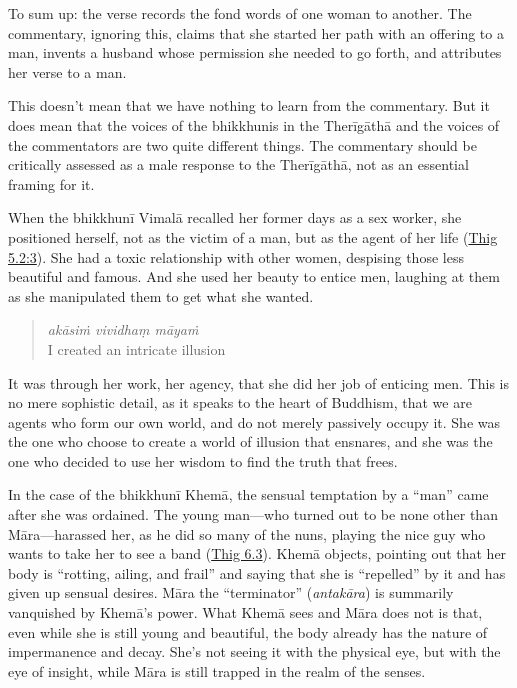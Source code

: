 \documentclass[12pt,openany]{book}%
\begin{document}
To sum up: the verse records the fond words of one woman to another. The commentary, ignoring this, claims that she started her path with an offering to a man, invents a husband whose permission she needed to go forth, and attributes her verse to a man.

This doesn’t mean that we have nothing to learn from the commentary. But it does mean that the voices of the bhikkhunis in the \textsanskrit{Therīgāthā} and the voices of the commentators are two quite different things. The commentary should be critically assessed as a male response to the \textsanskrit{Therīgāthā}, not as an essential framing for it.

When the \textsanskrit{bhikkhunī} \textsanskrit{Vimalā} recalled her former days as a sex worker, she positioned herself, not as the victim of a man, but as the agent of her life (\href{https://suttacentral.net/thig5.2/en/sujato\#3.1}{Thig 5.2:3}). She had a toxic relationship with other women, despising those less beautiful and famous. And she used her beauty to entice men, laughing at them as she manipulated them to get what she wanted.

\begin{quotation}%
\textit{\textsanskrit{akāsiṁ} vividhaṃ \textsanskrit{māyaṁ}} \\
I created an intricate illusion

%
\end{quotation}

It was through her work, her agency, that she did her job of enticing men. This is no mere sophistic detail, as it speaks to the heart of Buddhism, that we are agents who form our own world, and do not merely passively occupy it. She was the one who choose to create a world of illusion that ensnares, and she was the one who decided to use her wisdom to find the truth that frees.

In the case of the \textsanskrit{bhikkhunī} \textsanskrit{Khemā}, the sensual temptation by a “man” came after she was ordained. The young man—who turned out to be none other than \textsanskrit{Māra}—harassed her, as he did so many of the nuns, playing the nice guy who wants to take her to see a band (\href{https://suttacentral.net/thig6.3}{Thig 6.3}). \textsanskrit{Khemā} objects, pointing out that her body is “rotting, ailing, and frail” and saying that she is “repelled” by it and has given up sensual desires. \textsanskrit{Māra} the “terminator” (\textit{\textsanskrit{antakāra}}) is summarily vanquished by \textsanskrit{Khemā}’s power. What \textsanskrit{Khemā} sees and \textsanskrit{Māra} does not is that, even while she is still young and beautiful, the body already has the nature of impermanence and decay. She’s not seeing it with the physical eye, but with the eye of insight, while \textsanskrit{Māra} is still trapped in the realm of the senses.
\end{document}
